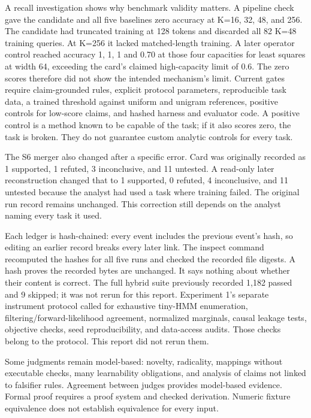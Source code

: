 A recall investigation shows why benchmark validity matters. A pipeline check gave the candidate and all five baselines zero accuracy at K=16, 32, 48, and 256. The candidate had truncated training at 128 tokens and discarded all 82 K=48 training queries. At K=256 it lacked matched-length training. A later operator control reached accuracy 1, 1, 1 and 0.70 at those four capacities for least squares at width 64, exceeding the card's claimed high-capacity limit of 0.6. The zero scores therefore did not show the intended mechanism's limit. Current gates require claim-grounded rules, explicit protocol parameters, reproducible task data, a trained threshold against uniform and unigram references, positive controls for low-score claims, and hashed harness and evaluator code. A positive control is a method known to be capable of the task; if it also scores zero, the task is broken. They do not guarantee custom analytic controls for every task.

The S6 merger also changed after a specific error. Card  was originally recorded as 1 supported, 1 refuted, 3 inconclusive, and 11 untested. A read-only later reconstruction changed that to 1 supported, 0 refuted, 4 inconclusive, and 11 untested because the analyst had used a task where training failed. The original run record remains unchanged. This correction still depends on the analyst naming every task it used.

Each ledger is hash-chained: every event includes the previous event's hash, so editing an earlier record breaks every later link. The inspect command recomputed the hashes for all five runs and checked the recorded file digests. A hash proves the recorded bytes are unchanged. It says nothing about whether their content is correct. The full hybrid suite previously recorded 1,182 passed and 9 skipped; it was not rerun for this report. Experiment 1's separate instrument protocol called for exhaustive tiny-HMM enumeration, filtering/forward-likelihood agreement, normalized marginals, causal leakage tests, objective checks, seed reproducibility, and data-access audits. Those checks belong to the protocol. This report did not rerun them.

Some judgments remain model-based: novelty, radicality, mappings without executable checks, many learnability obligations, and analysis of claims not linked to falsifier rules. Agreement between judges provides model-based evidence. Formal proof requires a proof system and checked derivation. Numeric fixture equivalence does not establish equivalence for every input.

